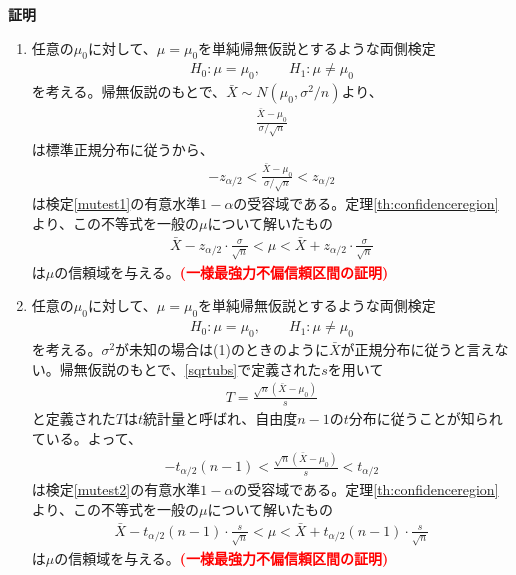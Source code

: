 \documentclass[11pt]{ltjsarticle}
\makeatletter
\theoremstyle{definition}
\newcommand{\cmt}[1]{\textcolor{red}{\textbf{(#1)}}}
\renewenvironment{proof}[1][証明]{\par
  \pushQED{\qed}%
  \normalfont \topsep6\p@\@plus6\p@\relax
  \trivlist
  \item\relax
  {\bfseries
  #1\@addpunct{.}}\hspace\labelsep\ignorespaces
}{%
  \popQED\endtrivlist\@endpefalse
}
\makeatother
\begin{document}
\begin{proof}
    \begin{enumerate}[(1)]
        \item 任意の$\mu_0$に対して、$\mu=\mu_0$を単純帰無仮説とするような両側検定
        \begin{align}\label{mutest1}
            H_0: \mu=\mu_0,\qquad H_1: \mu\neq \mu_0
        \end{align}
        を考える。帰無仮説のもとで、$\bar{X}\sim N(\mu_0, \sigma^2/n)$より、
        \begin{align}
            \frac{\bar{X}-\mu_0}{\sigma/\sqrt{n}}
        \end{align}
        は標準正規分布に従うから、
        \begin{align}
            -z_{\alpha/2} < \frac{\bar{X}-\mu_0}{\sigma/\sqrt{n}} < z_{\alpha/2}
        \end{align}
        は検定\eqref{mutest1}の有意水準$1-\alpha$の受容域である。定理\ref{th:confidenceregion}より、この不等式を一般の$\mu$について解いたもの
        \begin{align}
            \bar{X} - z_{\alpha/2}\cdot\frac{\sigma}{\sqrt{n}} < \mu < \bar{X} + z_{\alpha/2}\cdot\frac{\sigma}{\sqrt{n}}
        \end{align}
        は$\mu$の信頼域を与える。\cmt{一様最強力不偏信頼区間の証明}

        \item 任意の$\mu_0$に対して、$\mu=\mu_0$を単純帰無仮説とするような両側検定
        \begin{align}\label{mutest2}
            H_0: \mu=\mu_0,\qquad H_1: \mu\neq \mu_0
        \end{align}
        を考える。$\sigma^2$が未知の場合は(1)のときのように$\bar{X}$が正規分布に従うと言えない。帰無仮説のもとで、\eqref{sqrtubs}で定義された$s$を用いて
        \begin{align}
            T = \frac{\sqrt{n}(\bar{X}-\mu_0)}{s}
        \end{align}
        と定義された$T$は$t$統計量と呼ばれ、自由度$n-1$の$t$分布に従うことが知られている。よって、
        \begin{align}
            -t_{\alpha/2}(n-1) < \frac{\sqrt{n}(\bar{X}-\mu_0)}{s} < t_{\alpha/2}
        \end{align}
        は検定\eqref{mutest2}の有意水準$1-\alpha$の受容域である。定理\ref{th:confidenceregion}より、この不等式を一般の$\mu$について解いたもの
        \begin{align}
            \bar{X} - t_{\alpha/2}(n-1)\cdot\frac{s}{\sqrt{n}} < \mu < \bar{X} + t_{\alpha/2}(n-1)\cdot\frac{s}{\sqrt{n}}
        \end{align}
        は$\mu$の信頼域を与える。\cmt{一様最強力不偏信頼区間の証明}
    \end{enumerate}
\end{proof}
\end{document}
